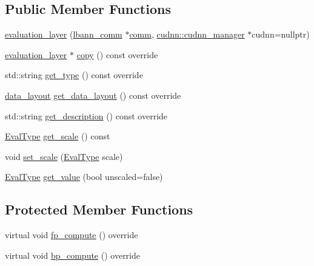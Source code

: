 \subsection*{Public Member Functions}
\begin{DoxyCompactItemize}
\item 
\hyperlink{classlbann_1_1evaluation__layer_a55aea0fdd91154eccbbd8a1e6a8ce5e3}{evaluation\+\_\+layer} (\hyperlink{classlbann_1_1lbann__comm}{lbann\+\_\+comm} $\ast$\hyperlink{file__io_8cpp_ab048c6f9fcbcfaa57ce68b00263dbebe}{comm}, \hyperlink{classlbann_1_1cudnn_1_1cudnn__manager}{cudnn\+::cudnn\+\_\+manager} $\ast$cudnn=nullptr)
\item 
\hyperlink{classlbann_1_1evaluation__layer}{evaluation\+\_\+layer} $\ast$ \hyperlink{classlbann_1_1evaluation__layer_a2fd584fec624d984d455ea82d92933ef}{copy} () const override
\item 
std\+::string \hyperlink{classlbann_1_1evaluation__layer_a8762999841e8afe89a87a9c3db3da0df}{get\+\_\+type} () const override
\item 
\hyperlink{base_8hpp_a786677cbfb3f5677b4d84f3056eb08db}{data\+\_\+layout} \hyperlink{classlbann_1_1evaluation__layer_af8a630d75b1aacc1ffc446d1c141d807}{get\+\_\+data\+\_\+layout} () const override
\item 
std\+::string \hyperlink{classlbann_1_1evaluation__layer_ac98eda59f9c45455f0f35f85cbd08a9b}{get\+\_\+description} () const override
\item 
\hyperlink{base_8hpp_a3266f5ac18504bbadea983c109566867}{Eval\+Type} \hyperlink{classlbann_1_1evaluation__layer_af4551d08c374c1f2c2d99eb543b6379d}{get\+\_\+scale} () const
\item 
void \hyperlink{classlbann_1_1evaluation__layer_a47fe13276e74f749f6fceebc25c63bcf}{set\+\_\+scale} (\hyperlink{base_8hpp_a3266f5ac18504bbadea983c109566867}{Eval\+Type} scale)
\item 
\hyperlink{base_8hpp_a3266f5ac18504bbadea983c109566867}{Eval\+Type} \hyperlink{classlbann_1_1evaluation__layer_a5300d3b7dd4719d2535f9b4838ae996f}{get\+\_\+value} (bool unscaled=false)
\end{DoxyCompactItemize}
\subsection*{Protected Member Functions}
\begin{DoxyCompactItemize}
\item 
virtual void \hyperlink{classlbann_1_1evaluation__layer_a6cb3ab97ec80b6cf8606b421d9761c1c}{fp\+\_\+compute} () override
\item 
virtual void \hyperlink{classlbann_1_1evaluation__layer_a7b2b0898c0b0a29e35ec14f766758551}{bp\+\_\+compute} () override
\end{DoxyCompactItemize}
